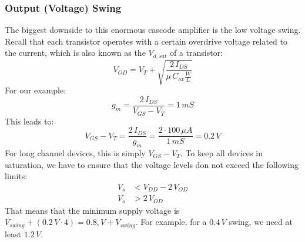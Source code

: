\subsubsection{Output (Voltage) Swing}
The biggest downside to this enormous cascode amplifier is the low voltage swing.  Recall that each transistor operates with a certain overdrive voltage related to the current, which is also known as the $V_{d,sat}$ of a transistor:
    \begin{equation}
        V_{OD} = V_T + \sqrt{\frac{2\,I_{DS}}{\mu\,C_{ox}\frac{W}{L}}}
    \end{equation}
For our example:
    \begin{equation} 
        g_m = \frac{2\,I_{DS}}{V_{GS} - V_T} = \boxed{1\,mS}
    \end{equation}
This leads to:
    \begin{equation}
        V_{GS} - V_T = \frac{2\,I_{DS}}{g_m} = \frac{2 \cdot 100\,\mu A}{1\,mS} = \boxed{0.2\,V}
    \end{equation}
For long channel devices, this is simply $V_{GS} - V_T$.  To keep all devices in saturation, we have to ensure that the voltage levels don not exceed the following limits:
    \begin{align}
        V_o &< V_{DD} - 2\,V_{OD}\\
        V_o &> 2\,V_{OD}
    \end{align} 
That means that the minimum supply voltage is $V_{swing} + (0.2\,V \cdot 4) = 0.8,V + V_{swing}$.  For example, for a $0.4\,V$ swing, we need at least $1.2\,V$.  

